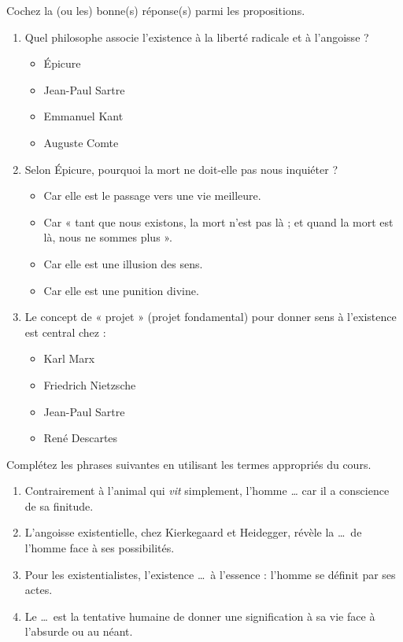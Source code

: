 \documentclass[11pt]{article}
\begin{document}
\begin{exercice}
Cochez la (ou les) bonne(s) réponse(s) parmi les propositions.
\begin{enumerate}
    \item Quel philosophe associe l'existence à la liberté radicale et à l'angoisse ?
    \begin{itemize}
        \item[A.] Épicure
        \item[B.] Jean-Paul Sartre
        \item[C.] Emmanuel Kant
        \item[D.] Auguste Comte
    \end{itemize}
    \item Selon Épicure, pourquoi la mort ne doit-elle pas nous inquiéter ?
    \begin{itemize}
        \item[A.] Car elle est le passage vers une vie meilleure.
        \item[B.] Car « tant que nous existons, la mort n'est pas là ; et quand la mort est là, nous ne sommes plus ».
        \item[C.] Car elle est une illusion des sens.
        \item[D.] Car elle est une punition divine.
    \end{itemize}
    \item Le concept de « projet » (projet fondamental) pour donner sens à l'existence est central chez :
    \begin{itemize}
        \item[A.] Karl Marx
        \item[B.] Friedrich Nietzsche
        \item[C.] Jean-Paul Sartre
        \item[D.] René Descartes
    \end{itemize}
\end{enumerate}
\end{exercice}

\begin{exercice}
Complétez les phrases suivantes en utilisant les termes appropriés du cours.
\begin{enumerate}
    \item Contrairement à l'animal qui \textit{vit} simplement, l'homme \textit{\dots} car il a conscience de sa finitude.
    \item L'angoisse existentielle, chez Kierkegaard et Heidegger, révèle la \dots\ de l'homme face à ses possibilités.
    \item Pour les existentialistes, l'existence \dots\ à l'essence : l'homme se définit par ses actes.
    \item Le \dots\ est la tentative humaine de donner une signification à sa vie face à l'absurde ou au néant.
\end{enumerate}
\end{exercice}
\end{document}
